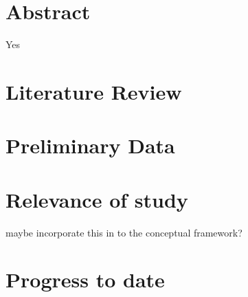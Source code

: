 \documentclass[12pt,a4paper]{article}
\author{D Maderazo}
\begin{document}
    \section*{Abstract}
    Yes
    
    \section{Literature Review}
    
        
        
            
            
        
    \section{Preliminary Data}
    \section{Relevance of study}
        maybe incorporate this in to the conceptual framework?
        
    \section{Progress to date}
    
    

\end{document}
